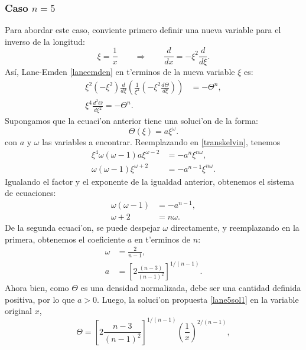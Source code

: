 \subsubsection{Caso \texorpdfstring{$n=5$}{n5}}\label{sec:exactas-n5}
Para abordar este caso, conviente primero definir una nueva variable para el inverso de la longitud:
\begin{equation}\label{lane5cambio}
 \xi=\frac{1}{x}\qquad\Rightarrow\qquad \frac{d}{d x}=-\xi^2\frac{d}{d\xi}.
\end{equation}
As\'i, Lane-Emden \eqref{laneemden} en t'erminos de la nueva variable $\xi$ es:
\begin{align}
\xi^2(-\xi^2)\frac{d}{d\xi}\left(\frac{1}{\xi^2}(-\xi^2\frac{d\Theta}{d\xi})\right)&=-\Theta^n, \\
\xi^4\frac{d^2\Theta}{d\xi^2}=-\Theta^n.\label{transkelvin}
\end{align}
Supongamos que la ecuaci'on anterior tiene una soluci'on de la forma:
\begin{equation}\label{lane5sol1}
 \Theta(\xi)=a\xi^{\omega}.
\end{equation}
con $a$ y $\omega$ las variables a encontrar. Reemplazando en \eqref{transkelvin}, tenemos
\begin{align}
 \xi^4\omega(\omega-1)a \xi^{\omega-2}&=-a^n \xi^{n\omega},\\
\omega(\omega-1)\xi^{\omega+2}&=-a^{n-1} \xi^{n\omega}.
\end{align}
Igualando el factor y el exponente de la igualdad anterior, obtenemos el sistema de ecuaciones:
\begin{align}
 \omega(\omega-1)&=-a^{n-1},\label{lane5a}\\
\omega+2&=n\omega.
\end{align}
De la segunda ecuaci'on, se puede despejar $\omega$ directamente, y reemplazando en la primera, obtenemos el coeficiente $a$ en t'erminos de $n$:
\begin{align}
 \omega&=\frac{2}{n-1} \label{lane5omega},\\
a&=\left[2\frac{(n-3)}{(n-1)^2}\right]^{1/(n-1)}\label{lane5a2}.
\end{align}
Ahora bien, como $\Theta$ es una densidad normalizada, debe ser una cantidad definida positiva, por lo que $a>0$. Luego, la soluci'on propuesta \eqref{lane5sol1} en la variable original $x$,
\begin{equation}
 \Theta=\left[2\frac{n-3}{(n-1)^2}\right]^{1/(n-1)}\left(\frac{1}{x}\right)^{2/(n-1)},
\end{equation}
